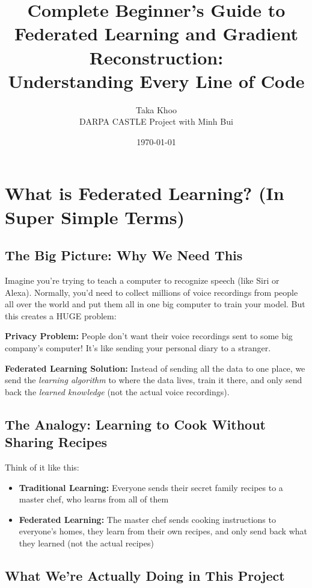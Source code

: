 \documentclass[12pt]{article}
\title{\textbf{Complete Beginner's Guide to Federated Learning and Gradient Reconstruction: \\ Understanding Every Line of Code}}
\author{Taka Khoo \\ DARPA CASTLE Project with Minh Bui}
\date{\today}
\begin{document}
\maketitle

\tableofcontents
\newpage

\section{What is Federated Learning? (In Super Simple Terms)}

\subsection{The Big Picture: Why We Need This}

Imagine you're trying to teach a computer to recognize speech (like Siri or Alexa). Normally, you'd need to collect millions of voice recordings from people all over the world and put them all in one big computer to train your model. But this creates a HUGE problem:

\textbf{Privacy Problem:} People don't want their voice recordings sent to some big company's computer! It's like sending your personal diary to a stranger.

\textbf{Federated Learning Solution:} Instead of sending all the data to one place, we send the \textit{learning algorithm} to where the data lives, train it there, and only send back the \textit{learned knowledge} (not the actual voice recordings).

\subsection{The Analogy: Learning to Cook Without Sharing Recipes}

Think of it like this:
\begin{itemize}
    \item \textbf{Traditional Learning:} Everyone sends their secret family recipes to a master chef, who learns from all of them
    \item \textbf{Federated Learning:} The master chef sends cooking instructions to everyone's homes, they learn from their own recipes, and only send back what they learned (not the actual recipes)
\end{itemize}

\subsection{What We're Actually Doing in This Project}
\end{document}
